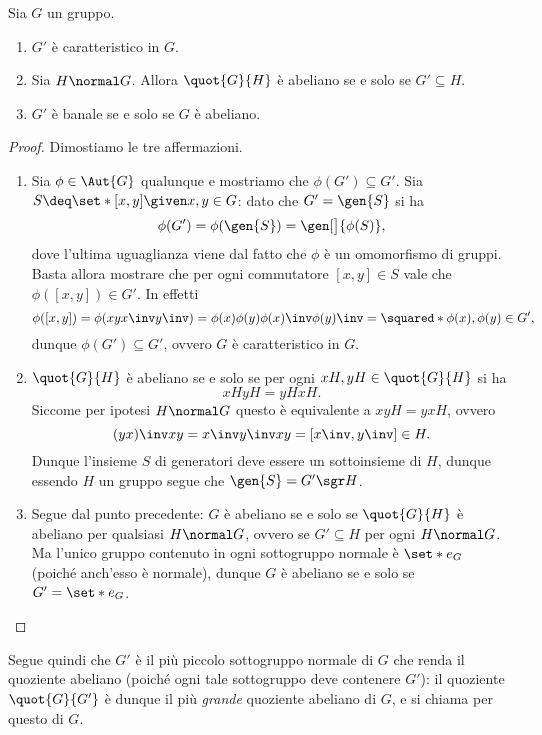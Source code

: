 \begin{proposition}
    {}{}
    Sia $G$ un gruppo.
    \begin{enumerate}[(1)]
        \item $G'$ è caratteristico in $G$.
        \item Sia $H \normal G$. Allora $\quot{G}{H}$ è abeliano se e solo se $G' \subseteq H$.   
        \item $G'$ è banale se e solo se $G$ è abeliano.
    \end{enumerate}
\end{proposition}
\begin{proof}
    Dimostiamo le tre affermazioni.
    \begin{enumerate}[(1)]
        \item Sia $\phi \in \Aut{G}$ qualunque e mostriamo che $\phi(G') \subseteq G'$. Sia $S \deq \set*{[x, y] \given x, y \in G}$: dato che $G' = \gen{S}$ si ha \[
            \phi(G') = \phi(\gen{S}) = \gen[\big]{\phi(S)},
        \] dove l'ultima uguaglianza viene dal fatto che $\phi$ è un omomorfismo di gruppi. Basta allora mostrare che per ogni commutatore $[x, y] \in S$ vale che $\phi([x, y]) \in G'$. In effetti \[
            \phi([x, y]) = \phi(xyx\inv y\inv) = \phi(x)\phi(y)\phi(x)\inv \phi(y)\inv = \squared*{\phi(x), \phi(y)} \in G',
        \] dunque $\phi(G') \subseteq G'$, ovvero $G$ è caratteristico in $G$.
        \item $\quot{G}{H}$ è abeliano se e solo se per ogni $xH, yH \in \quot{G}{H}$ si ha \[
            xHyH = yHxH.
        \] Siccome per ipotesi $H \normal G$ questo è equivalente a $xyH = yxH$, ovvero \[
            (yx)\inv xy = x\inv y\inv xy = [x\inv, y\inv] \in H.
        \] Dunque l'insieme $S$ di generatori deve essere un sottoinsieme di $H$, dunque essendo $H$ un gruppo segue che $\gen{S} = G' \sgr H$.
        \item Segue dal punto precedente: $G$ è abeliano se e solo se $\quot{G}{H}$ è abeliano per qualsiasi $H \normal G$, ovvero se $G' \subseteq H$ per ogni $H \normal G$. Ma l'unico gruppo contenuto in ogni sottogruppo normale è $\set*{e_G}$ (poiché anch'esso è normale), dunque $G$ è abeliano se e solo se $G' = \set*{e_G}$.  \qedhere   
    \end{enumerate}
\end{proof}

Segue quindi che $G'$ è il più piccolo sottogruppo normale di $G$ che renda il quoziente abeliano (poiché ogni tale sottogruppo deve contenere $G'$): il quoziente $\quot{G}{G'}$ è dunque il più \emph{grande} quoziente abeliano di $G$, e si chiama per questo  di $G$. 